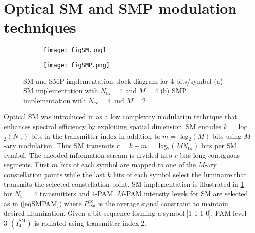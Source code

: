 \section{Optical SM and SMP modulation techniques}
\label{sec:osm}

\graphicspath{{_MIMOSpace/figures_osm/}}


\begin{figure}[t]
	\centering
		\begin{subfigure}{0.49\textwidth}
		\centering
				\texttt{[image: figSM.png]}
		\caption{}
		\label{figSM}			
		\end{subfigure}
		\hfill
		\begin{subfigure}{0.49\textwidth}
		\centering
				\texttt{[image: figSMP.png]}
				\caption{}
				\label{figSMP}
		\end{subfigure}
\caption[SM and SMP implementation block diagram]{SM and SMP implementation block diagram for 4 bits/symbol (a) SM implementation with $N_{\text{tx}} = 4$ and $M = 4$ (b) SMP implementation with $N_{\text{tx}} = 4$ and $M = 2$}
	\label{fig:SpatialModulation}
\end{figure}

Optical SM was introduced in \cite{mes06a} as a low complexity modulation technique that enhances spectral efficiency by exploiting spatial dimension. SM encodes $k =$ log$^{ }_{2}(N_{\text{tx}})$ bits in the transmitter index in addition to $m=$ log$^{ }_{2}(M)$ bits using $M$-ary modulation. Thus SM transmits $r=k+m=$ log$^{ }_{2}(MN_{\text{tx}})$ bits per SM symbol. The encoded information stream is divided into $r$ bits long contiguous segments. First $m$ bits of each symbol are mapped to one of the $M$-ary constellation points while the last $k$ bits of each symbol select the luminaire that transmits the selected constellation point. SM implementation is illustrated in \figurename{ \ref{figSM}} for $N_{\text{tx}}=4$ transmitters and 4-PAM. $M$-PAM intensity levels for SM are selected as in (\ref{eqSMPAM}) where $P^{\text{tx}}_{\text{avg}}$ is the average signal constraint to maintain desired illumination. Given a bit sequence forming a symbol [1 1 1 0], PAM level 3 $(I_4^{\text{SM}})$ is radiated using transmitter index $2$.

